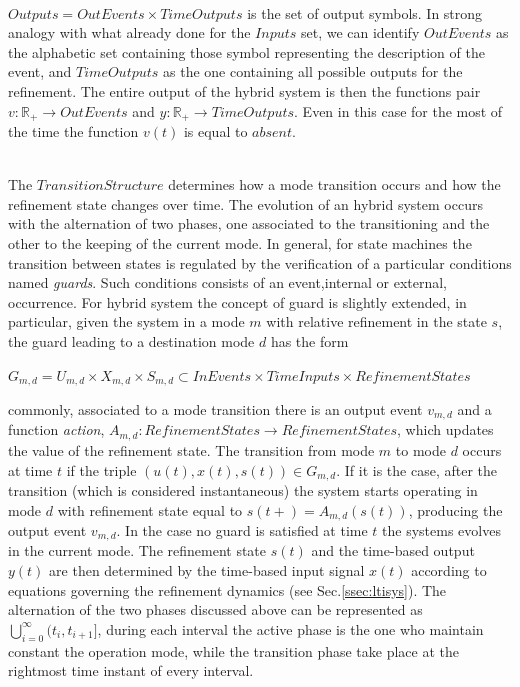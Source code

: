 \noindent
\\
$Outputs = OutEvents \times TimeOutputs$ is the set of output symbols. In strong analogy with what already done for the $Inputs$ set, we can identify $OutEvents$ as the alphabetic set containing those symbol representing the description of the event, and $TimeOutputs$ as the one containing all possible outputs for the refinement. The entire output of the hybrid system is then the functions pair $v:\mathbb{R}_{+}\rightarrow OutEvents$ and $y:\mathbb{R}_{+}\rightarrow TimeOutputs$. Even in this case for the most of the time the function $v(t)$ is equal to $absent$.

\noindent
\\
The $TransitionStructure$ determines how a mode transition occurs and how the refinement state changes over time. The evolution of an hybrid system occurs with the alternation of two phases, one associated to the transitioning and the other to the keeping of the current mode. In general, for state machines the transition between states is regulated by the verification of a particular conditions named \textit{guards}. Such conditions consists of an event,internal or external, occurrence. For hybrid system the concept of guard is slightly extended, in particular, given the system in a mode $m$ with relative refinement in the state $s$, the guard leading to a destination mode $d$ has the form
\begin{center}
$G_{m,d}=U_{m,d} \times X_{m,d} \times S_{m,d} \subset InEvents \times TimeInputs \times RefinementStates$
\end{center}
commonly, associated to a mode transition there is an output event $v_{m,d}$ and a function \textit{action}, $A_{m,d}:RefinementStates\rightarrow RefinementStates$, which updates the value of the refinement state. The transition from mode $m$ to mode $d$ occurs at time $t$ if the triple $(u(t),x(t),s(t))\in G_{m,d}$. If it is the case, after the transition (which is considered instantaneous) the system starts operating in mode $d$ with refinement state equal to $s(t+) = A_{m,d}(s(t))$, producing the output event $v_{m,d}$. In the case no guard is satisfied at time $t$ the systems evolves in the current mode. The refinement state $s(t)$ and the time-based output $y(t)$ are then determined by the time-based input signal $x(t)$ according to equations governing
the refinement dynamics (see Sec.\ref{ssec:ltisys}). The alternation of the two phases discussed above can be represented as $\bigcup\limits_{i=0}^{\infty}(t_i,t_{i+1}]$, during each interval the active phase is the one who maintain constant the operation mode, while the transition phase take place at the rightmost time instant of every interval.

